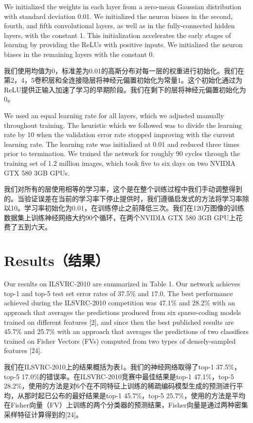 \documentclass[12pt,a4paper,UTF8,twoside]{book}
\begin{document}
We initialized the weights in each layer from a zero-mean Gaussian distribution with standard deviation 0.01. We initialized the neuron biases in the second, fourth, and fifth convolutional layers, as well as in the fully-connected hidden layers, with the constant 1. This initialization accelerates the early stages of learning by providing the ReLUs with positive inputs. We initialized the neuron biases in the remaining layers with the constant 0.

我们使用均值为0，标准差为0.01的高斯分布对每一层的权重进行初始化。我们在第2，4，5卷积层和全连接隐层将神经元偏置初始化为常量1。这个初始化通过为ReLU提供正输入加速了学习的早期阶段。我们在剩下的层将神经元偏置初始化为0。

We used an equal learning rate for all layers, which we adjusted manually throughout training. The heuristic which we followed was to divide the learning rate by 10 when the validation error rate stopped improving with the current learning rate. The learning rate was initialized at 0.01 and reduced three times prior to termination. We trained the network for roughly 90 cycles through the training set of 1.2 million images, which took five to six days on two NVIDIA GTX 580 3GB GPUs.

我们对所有的层使用相等的学习率，这个是在整个训练过程中我们手动调整得到的。当验证误差在当前的学习率下停止提供时，我们遵循启发式的方法将学习率除以10。学习率初始化为0.01，在训练停止之前降低三次。我们在120万图像的训练数据集上训练神经网络大约90个循环，在两个NVIDIA GTX 580 3GB GPU上花费了五到六天。

\hypertarget{resultsux7ed3ux679c}{%
\section{Results（结果）}\label{resultsux7ed3ux679c}}

Our results on ILSVRC-2010 are summarized in Table 1. Our network achieves top-1 and top-5 test set error rates of 37.5\% and \(17.0%
\). The best performance achieved during the ILSVRC-2010 competition was 47.1\% and 28.2\% with an approach that averages the predictions produced from six sparse-coding models trained on different features {[}2{]}, and since then the best published results are 45.7\% and 25.7\% with an approach that averages the predictions of two classifiers trained on Fisher Vectors (FVs) computed from two types of densely-sampled features {[}24{]}.

我们在ILSVRC-2010上的结果概括为表1。我们的神经网络取得了top-1 37.5\%，top-5 17.0\%的错误率。在ILSVRC-2010竞赛中最佳结果是top-1 47.1\%，top-5 28.2\%，使用的方法是对6个在不同特征上训练的稀疏编码模型生成的预测进行平均，从那时起已公布的最好结果是top-1 45.7\%，top-5 25.7\%，使用的方法是平均在Fisher向量（FV）上训练的两个分类器的预测结果，Fisher向量是通过两种密集采样特征计算得到的{[}24{]}。
\end{document}
